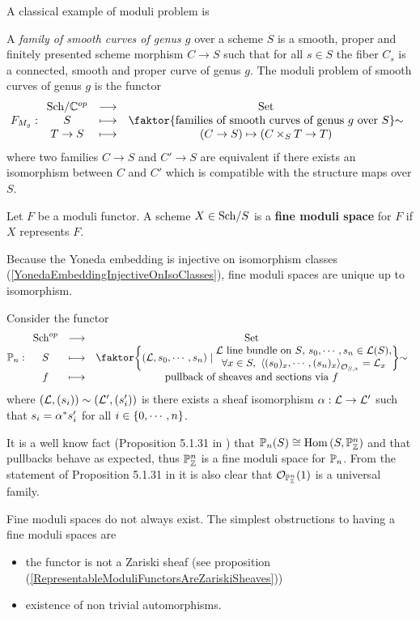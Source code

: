 A classical example of moduli problem is
\begin{example}
A \textit{family of smooth curves of genus $g$} over a scheme $S$ is a smooth, proper and finitely presented scheme morphism $C\to S$ such that for all $s\in S$ the fiber $C_s$ is a connected, smooth and proper curve of genus $g$. The moduli problem of smooth curves of genus $g$ is the functor
\[F_{M_g}:\functorDef{\Sch\C\op}{\Set}{S}{\quot{\cpa{\text{families of smooth curves of genus $g$ over $S$}}}\sim}{T\to S}{(C\to S)\mapsto (C\times_S T\to T)}\]
where two families $C\to S$ and $C'\to S$ are equivalent if there exists an isomorphism between $C$ and $C'$ which is compatible with the structure maps over $S$.
\end{example}

\begin{definition}
Let $F$ be a moduli functor. A scheme $X\in {\mathrm{Sch}}/{S}$ is a \textbf{fine moduli space} for $F$ if $X$ represents $F$.
\end{definition}

\begin{remark}
Because the Yoneda embedding is injective on isomorphism classes (\ref{YonedaEmbeddingInjectiveOnIsoClasses}), fine moduli spaces are unique up to isomorphism.
\end{remark}

\begin{example}
Consider the functor
\[\Pj_n:\functorDef{\mathrm{Sch}\op}{\Set}{S}{\quot{\cpa{(\Lc,s_0,\cdots,s_n)\mid \emat{\Lc\text{ line bundle on $S$, }s_0,\cdots,s_n\in\Lc(S),\\\forall x\in S,\ \ps{(s_0)_x,\cdots,(s_n)_x}_{\Oc_{S,x}}=\Lc_x}}}\sim}{f}{\text{pullback of sheaves and sections via $f$}}\]
where $(\mathcal{L},(s_i))\sim (\mathcal{L}',(s_i'))$ is there exists a sheaf isomorphism $\alpha:\mathcal{L}\to\mathcal{L}'$ such that $s_i=\alpha^\ast s_i'$ for all $i\in\left\{{0,\cdots, n}\right\}$.\medskip

It is a well know fact (Proposition 5.1.31 in \cite{QingLiu}) that $\mathbb{P}_n(S)\cong \mathrm{Hom}\,(S,\mathbb{P}^n_{\mathbb{Z}})$ and that pullbacks behave as expected, thus $\mathbb{P}^n_{\mathbb{Z}}$ is a fine moduli space for $\mathbb{P}_n$.
From the statement of Proposition 5.1.31 in \cite{QingLiu} it is also clear that $\mathcal{O}_{\mathbb{P}^n_{\mathbb{Z}}}(1)$ is a universal family.
\end{example}

Fine moduli spaces do not always exist. The simplest obstructions to having a fine moduli spaces are
\begin{itemize}
\item the functor is not a Zariski sheaf (see proposition (\ref{RepresentableModuliFunctorsAreZariskiSheaves}))
\item existence of non trivial automorphisms.
\end{itemize}


